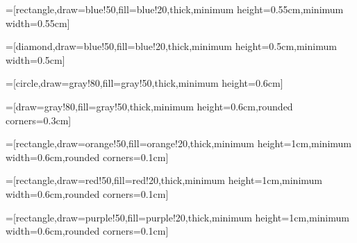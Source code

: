 \usepackage{tikz}
\usepackage{pgfplots}
\pgfplotsset{compat=1.7}

\usetikzlibrary{arrows,calc,shapes,decorations.pathreplacing,calligraphy}
\tikzset{>=latex}
	

	
=[rectangle,draw=blue!50,fill=blue!20,thick,minimum height=0.55cm,minimum width=0.55cm]

=[diamond,draw=blue!50,fill=blue!20,thick,minimum height=0.5cm,minimum width=0.5cm]

=[circle,draw=gray!80,fill=gray!50,thick,minimum height=0.6cm]

=[draw=gray!80,fill=gray!50,thick,minimum height=0.6cm,rounded corners=0.3cm]
 
=[rectangle,draw=orange!50,fill=orange!20,thick,minimum height=1cm,minimum width=0.6cm,rounded corners=0.1cm]

=[rectangle,draw=red!50,fill=red!20,thick,minimum height=1cm,minimum width=0.6cm,rounded corners=0.1cm]

=[rectangle,draw=purple!50,fill=purple!20,thick,minimum height=1cm,minimum width=0.6cm,rounded corners=0.1cm]




\newcommand{\Left}[3]{
 	\pgfmathparse{#1 + #3}
 	\node[tensor] (tens) at (#1 , #2) {};
	\node (d1) at (\pgfmathresult , #2 + 1.5) {};
 	\node (d2) at (\pgfmathresult , #2 - 1.5) {};
 	\node (d3) at (\pgfmathresult , #2) {};    
    
    \draw[-] (d1.west) .. controls (#1, #2 + 1.5) .. (tens.north);
    \draw[-] (d2.west) .. controls (#1, #2 - 1.5) .. (tens.south);
	\draw[-] (tens) -- (d3);
}

\newcommand{\Right}[3]{
 	\pgfmathparse{#1 - #3}
 	\node[tensor] (tens) at (#1 , #2) {};
	\node (d1) at (\pgfmathresult , #2 + 1.5) {};
 	\node (d2) at (\pgfmathresult , #2 - 1.5) {};
 	\node (d3) at (\pgfmathresult , #2) {};    
    
    \draw[-] (d1.east) .. controls (#1, #2 + 1.5) .. (tens.north);
    \draw[-] (d2.east) .. controls (#1, #2 - 1.5) .. (tens.south);
	\draw[-] (tens) -- (d3);
}

\newcommand{\SVD}[3]{
 	\node[tensor] (U) at (#1 , #2) {};
	\node (Ulabel) at (#1 , #2 + 0.6) {$U$};
	\draw[-] (U) -- (#1 -0.8, #2);
	\draw[-] (U) -- (#1 , #2 - 0.8); 	
 	
 	\node[matrix] (S) at (#1 + #3, #2) {};
 	\node (Slabel) at (#1 + #3 , #2 + 0.6) {$S$};	
 	
 	\node[tensor] (V) at (#1 + #3 *2 , #2) {};
 	\node (Vlabel) at (#1 + #3 *2 , #2 + 0.6) {$V^{\dag}$};
 	\draw[-] (V) -- (#1 + #3 *2 +0.8, #2);
	\draw[-] (V) -- (#1 + #3 *2 , #2 - 0.8);
	
	\draw[-] (U) -- (S);
	\draw[-] (V) -- (S);
}

